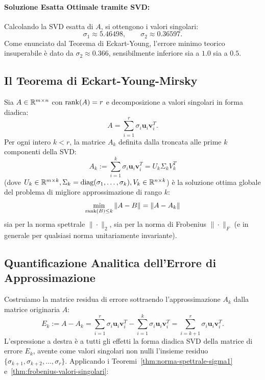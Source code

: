 \paragraph{Soluzione Esatta Ottimale tramite SVD:}
Calcolando la SVD esatta di $A$, si ottengono i valori singolari:
\begin{equation}
    \sigma_1 \approx 5.46498, \qquad \sigma_2 \approx 0.36597.
\end{equation}
Come enunciato dal Teorema di Eckart-Young, l'errore minimo teorico insuperabile \`e dato da $\sigma_2 \approx 0.366$, sensibilmente inferiore sia a $1.0$ sia a $0.5$.

\subsection{Il Teorema di Eckart-Young-Mirsky}

\begin{theorem}
\label{thm:eckart-young}
Sia $A \in \mathbb{R}^{m \times n}$ con $\operatorname{rank}(A) = r$ e decomposizione a valori singolari in forma diadica:
\begin{equation}
    A = \sum_{i=1}^r \sigma_i \mathbf{u}_i \mathbf{v}_i^T.
\end{equation}
Per ogni intero $k < r$, la matrice $A_k$ definita dalla troncata alle prime $k$ componenti della SVD:
\begin{equation}
    A_k := \sum_{i=1}^k \sigma_i \mathbf{u}_i \mathbf{v}_i^T = U_k \Sigma_k V_k^T
\end{equation}
(dove $U_k \in \mathbb{R}^{m \times k}, \Sigma_k = \operatorname{diag}(\sigma_1, \dots, \sigma_k), V_k \in \mathbb{R}^{n \times k}$) \`e la soluzione ottima globale del problema di migliore approssimazione di rango $k$:
\begin{equation}
    \min_{\operatorname{rank}(B) \le k} \|A - B\| = \|A - A_k\|
\end{equation}
sia per la norma spettrale $\|\cdot\|_2$, sia per la norma di Frobenius $\|\cdot\|_F$ (e in generale per qualsiasi norma unitariamente invariante).
\end{theorem}

\subsection{Quantificazione Analitica dell'Errore di Approssimazione}

Costruiamo la matrice residua di errore sottraendo l'approssimazione $A_k$ dalla matrice originaria $A$:
\begin{equation}
    E_k := A - A_k = \sum_{i=1}^r \sigma_i \mathbf{u}_i \mathbf{v}_i^T - \sum_{i=1}^k \sigma_i \mathbf{u}_i \mathbf{v}_i^T = \sum_{i=k+1}^r \sigma_i \mathbf{u}_i \mathbf{v}_i^T.
\end{equation}
L'espressione a destra \`e a tutti gli effetti la forma diadica SVD della matrice di errore $E_k$, avente come valori singolari non nulli l'insieme residuo $\{\sigma_{k+1}, \sigma_{k+2}, \dots, \sigma_r\}$.
Applicando i Teoremi~\ref{thm:norma-spettrale-sigma1} e~\ref{thm:frobenius-valori-singolari}:

